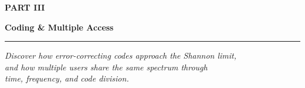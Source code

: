 
\cleardoublepage
\thispagestyle{empty}  %

\vspace*{40pt}  %

\begin{center}

{\sffamily\bfseries\fontsize{60}{68}\selectfont PART III}

\vspace{30pt}

{\sffamily\bfseries\fontsize{48}{56}\selectfont Coding \& Multiple Access}

\vspace{20pt}

\rule{0.5\textwidth}{0.4pt}  %

\vspace{20pt}

{\itshape\large
Discover how error-correcting codes approach the Shannon limit,\\
and how multiple users share the same spectrum through\\
time, frequency, and code division.
}

\end{center}

\vspace{80pt}  %

\clearpage
